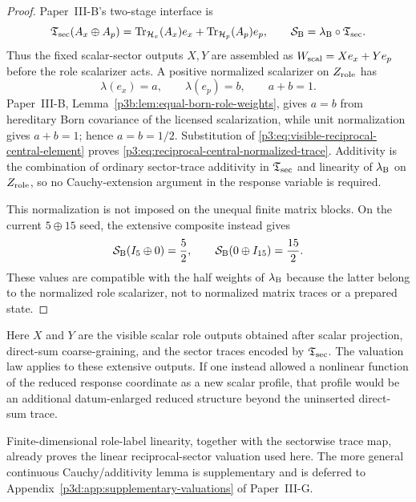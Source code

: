 \documentclass[12pt,a4paper]{article}
\begin{document}
\begin{proof}
Paper~III-B's two-stage interface is
\[
 \mathfrak T_{\rm sec}(A_x\oplus A_p)
 =\operatorname{Tr}_{\mathcal H_x}(A_x)e_x
  +\operatorname{Tr}_{\mathcal H_p}(A_p)e_p,
 \qquad
 \mathcal S_{\rm B}=\lambda_{\rm B}\circ\mathfrak T_{\rm sec}.
\]
Thus the fixed scalar-sector outputs \(X,Y\) are assembled as
\(W_{\rm scal}=Xe_x+Ye_p\) before the role scalarizer acts.  A positive
normalized scalarizer on \(Z_{\rm role}\) has
\[
        \lambda(e_x)=a,\qquad \lambda(e_p)=b,
        \qquad a+b=1.
\]
Paper~III-B, Lemma~\ref{p3b:lem:equal-born-role-weights}, gives \(a=b\) from hereditary Born covariance of the licensed scalarization, while unit normalization gives \(a+b=1\); hence \(a=b=1/2\).  Substitution of
\eqref{p3:eq:visible-reciprocal-central-element} proves
\eqref{p3:eq:reciprocal-central-normalized-trace}.  Additivity is the
combination of ordinary sector-trace additivity in \(\mathfrak T_{\rm sec}\)
and linearity of \(\lambda_{\rm B}\) on \(Z_{\rm role}\), so no
Cauchy-extension argument in the response variable is required.

This normalization is not imposed on the unequal finite matrix blocks.  On
the current \(5\oplus15\) seed, the extensive composite instead gives
\[
 \mathcal S_{\rm B}(I_5\oplus0)=\frac52,
 \qquad
 \mathcal S_{\rm B}(0\oplus I_{15})=\frac{15}{2}.
\]
These values are compatible with the half weights of \(\lambda_{\rm B}\)
because the latter belong to the normalized role scalarizer, not to normalized
matrix traces or a prepared state.
\end{proof}
\begin{remark}
Here \(X\) and \(Y\) are the visible scalar role outputs obtained after
scalar projection, direct-sum coarse-graining, and the sector traces encoded
by \(\mathfrak T_{\rm sec}\).  The valuation law applies to these extensive
outputs.  If one instead allowed a nonlinear function of the reduced response
coordinate as a new scalar profile, that profile would be an additional
datum-enlarged reduced structure beyond the uninserted direct-sum trace.
\end{remark}


\begin{remark}
Finite-dimensional role-label linearity, together with the sectorwise trace
map, already proves the linear reciprocal-sector valuation used here.  The more general continuous
Cauchy/additivity lemma is supplementary and is deferred to
Appendix~\ref{p3d:app:supplementary-valuations} of Paper~III-G.
\end{remark}
\end{document}
